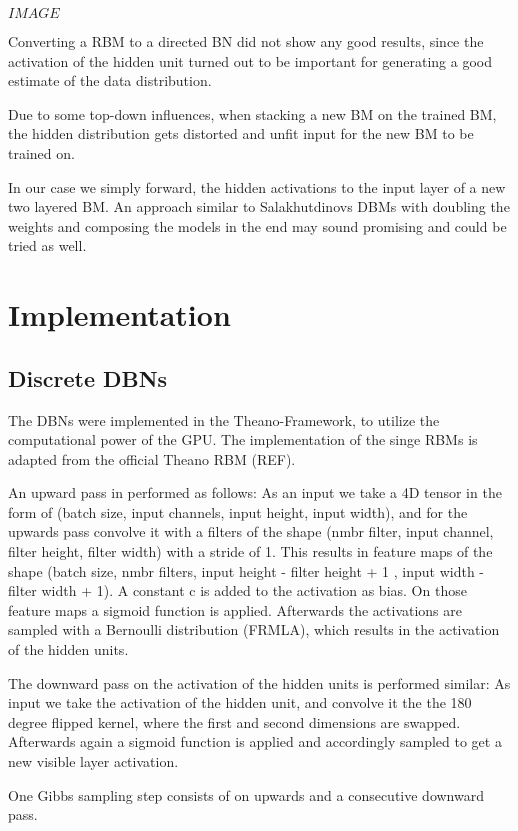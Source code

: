$IMAGE$

Converting a RBM to a directed BN did not show any good results, since the activation of the hidden unit turned out to be important for generating a good estimate of the data distribution. 

Due to some top-down influences, when stacking a new BM on the trained BM, the hidden distribution gets distorted and unfit input for the new BM to be trained on. 

In our case we simply forward, the hidden activations to the input layer of a new two layered BM. 
An approach similar to Salakhutdinovs DBMs with doubling the weights and composing the models in the end may sound promising and could be tried as well.

\chapter{Implementation}


\section{Discrete DBNs}

The DBNs were implemented in the Theano-Framework, to utilize the computational power of the GPU.
The implementation of the singe RBMs is adapted from the official Theano RBM (REF).

An upward pass in performed as follows:
As an input we take a 4D tensor in the form of (batch size, input channels, input height, input width), and for the upwards pass convolve it with a filters of the shape (nmbr filter, input channel, filter height, filter width) with a stride of 1.
This results in feature maps of the shape (batch size, nmbr filters, input height - filter height + 1 , input width - filter width + 1).
A constant c is added to the activation as bias.
On those feature maps a sigmoid function is applied. 
Afterwards the activations are sampled with a Bernoulli distribution (FRMLA), which results in the activation of the hidden units.

The downward pass on the activation of the hidden units is performed similar:
As input we take the activation of the hidden unit, and convolve it the the 180 degree flipped kernel, where the first and second dimensions are swapped.
Afterwards again a sigmoid function is applied and accordingly sampled to get a new visible layer activation.

One Gibbs sampling step consists of on upwards and a consecutive downward pass.

